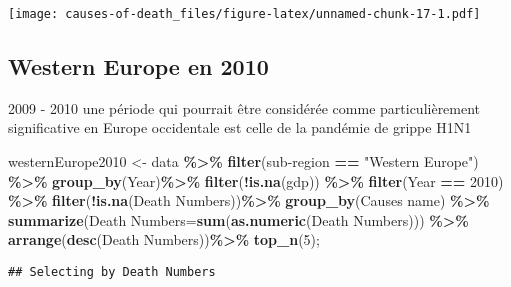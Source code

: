 \documentclass[
]{article}
\newenvironment{Shaded}{\begin{snugshade}}{\end{snugshade}}
\newcommand{\AttributeTok}[1]{\textcolor[rgb]{0.13,0.29,0.53}{#1}}
\newcommand{\DecValTok}[1]{\textcolor[rgb]{0.00,0.00,0.81}{#1}}
\newcommand{\FunctionTok}[1]{\textcolor[rgb]{0.13,0.29,0.53}{\textbf{#1}}}
\newcommand{\NormalTok}[1]{#1}
\newcommand{\OtherTok}[1]{\textcolor[rgb]{0.56,0.35,0.01}{#1}}
\newcommand{\SpecialCharTok}[1]{\textcolor[rgb]{0.81,0.36,0.00}{\textbf{#1}}}
\newcommand{\StringTok}[1]{\textcolor[rgb]{0.31,0.60,0.02}{#1}}
\begin{document}
\texttt{[image: causes-of-death\_files/figure-latex/unnamed-chunk-17-1.pdf]}

\hypertarget{western-europe-en-2010}{%
\subsection{Western Europe en 2010}\label{western-europe-en-2010}}

2009 - 2010 une période qui pourrait être considérée comme
particulièrement significative en Europe occidentale est celle de la
pandémie de grippe H1N1

\begin{Shaded}
\begin{Highlighting}[]
\NormalTok{westernEurope2010 }\OtherTok{\textless{}{-}}\NormalTok{ data }\SpecialCharTok{\%\textgreater{}\%}
\FunctionTok{filter}\NormalTok{(}\StringTok{\textasciigrave{}}\AttributeTok{sub{-}region}\StringTok{\textasciigrave{}} \SpecialCharTok{==} \StringTok{"Western Europe"}\NormalTok{)  }\SpecialCharTok{\%\textgreater{}\%}
\FunctionTok{group\_by}\NormalTok{(Year)}\SpecialCharTok{\%\textgreater{}\%}
\FunctionTok{filter}\NormalTok{(}\SpecialCharTok{!}\FunctionTok{is.na}\NormalTok{(gdp)) }\SpecialCharTok{\%\textgreater{}\%}
\FunctionTok{filter}\NormalTok{(Year }\SpecialCharTok{==} \DecValTok{2010}\NormalTok{) }\SpecialCharTok{\%\textgreater{}\%}
\FunctionTok{filter}\NormalTok{(}\SpecialCharTok{!}\FunctionTok{is.na}\NormalTok{(}\StringTok{\textasciigrave{}}\AttributeTok{Death Numbers}\StringTok{\textasciigrave{}}\NormalTok{))}\SpecialCharTok{\%\textgreater{}\%}
  \FunctionTok{group\_by}\NormalTok{(}\StringTok{\textasciigrave{}}\AttributeTok{Causes name}\StringTok{\textasciigrave{}}\NormalTok{) }\SpecialCharTok{\%\textgreater{}\%}
  \FunctionTok{summarize}\NormalTok{(}\StringTok{\textasciigrave{}}\AttributeTok{Death Numbers}\StringTok{\textasciigrave{}}\OtherTok{=}\FunctionTok{sum}\NormalTok{(}\FunctionTok{as.numeric}\NormalTok{(}\StringTok{\textasciigrave{}}\AttributeTok{Death Numbers}\StringTok{\textasciigrave{}}\NormalTok{))) }\SpecialCharTok{\%\textgreater{}\%}
  \FunctionTok{arrange}\NormalTok{(}\FunctionTok{desc}\NormalTok{(}\StringTok{\textasciigrave{}}\AttributeTok{Death Numbers}\StringTok{\textasciigrave{}}\NormalTok{))}\SpecialCharTok{\%\textgreater{}\%}
  \FunctionTok{top\_n}\NormalTok{(}\DecValTok{5}\NormalTok{);}
\end{Highlighting}
\end{Shaded}

\begin{verbatim}
## Selecting by Death Numbers
\end{verbatim}
\end{document}

